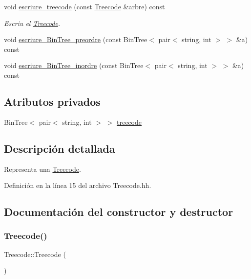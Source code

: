 \begin{DoxyCompactItemize}
\item 
void \hyperlink{class_treecode_acfa6c1b465b514251f7101b61195d50f}{escriure\+\_\+treecode} (const \hyperlink{class_treecode}{Treecode} \&arbre) const
\begin{DoxyCompactList}\small\item\em Escriu el \hyperlink{class_treecode}{Treecode}. \end{DoxyCompactList}\item 
void \hyperlink{class_treecode_a294ce0a89de8d9cc2774bc0e7bf545b2}{escriure\+\_\+\+Bin\+Tree\+\_\+preordre} (const Bin\+Tree$<$ pair$<$ string, int $>$ $>$ \&a) const
\item 
void \hyperlink{class_treecode_a62b82cb668f780cf882df8109c13aeb4}{escriure\+\_\+\+Bin\+Tree\+\_\+inordre} (const Bin\+Tree$<$ pair$<$ string, int $>$ $>$ \&a) const
\end{DoxyCompactItemize}
\subsection*{Atributos privados}
\begin{DoxyCompactItemize}
\item 
Bin\+Tree$<$ pair$<$ string, int $>$ $>$ \hyperlink{class_treecode_abd4467b0a13a57fcd3bddf4a60853372}{treecode}
\end{DoxyCompactItemize}


\subsection{Descripción detallada}
Representa una \hyperlink{class_treecode}{Treecode}. 

Definición en la línea 15 del archivo Treecode.\+hh.



\subsection{Documentación del constructor y destructor}
\mbox{\label{class_treecode_a190d6af790b7046ed7c96e7a57f0cd38}} 
\subsubsection{\texorpdfstring{Treecode()}{Treecode()}\hspace{0.1cm}{\footnotesize\ttfamily [1/3]}}
{\footnotesize\ttfamily Treecode\+::\+Treecode (\begin{DoxyParamCaption}{ }\end{DoxyParamCaption})}



